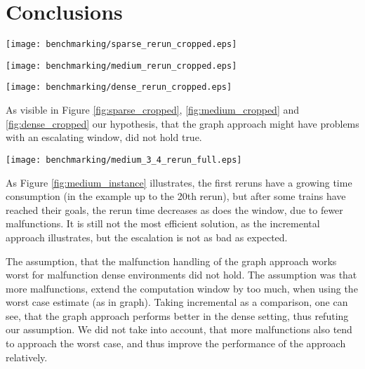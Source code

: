 \section{Conclusions}
\begin{figure*}
    \begin{minipage}[t]{0.32\textwidth}
        \texttt{[image: benchmarking/sparse\_rerun\_cropped.eps]}
        \caption{Sparse: Reruns}
        \label{fig:sparse_cropped}
    \end{minipage}
    \begin{minipage}[t]{0.32\textwidth}
        \texttt{[image: benchmarking/medium\_rerun\_cropped.eps]}
        \caption{Medium: Reruns}
        \label{fig:medium_cropped}
    \end{minipage}
    \begin{minipage}[t]{0.32\textwidth}
        \texttt{[image: benchmarking/dense\_rerun\_cropped.eps]}
        \caption{Dense: Reruns}
        \label{fig:dense_cropped}
    \end{minipage}
\end{figure*}

As visible in Figure \ref{fig:sparse_cropped}, \ref{fig:medium_cropped} and \ref{fig:dense_cropped} our hypothesis, that the graph approach might have problems with an escalating window, did not hold true.

\begin{figure*}
	\texttt{[image: benchmarking/medium\_3\_4\_rerun\_full.eps]}
	\caption{A selected medium Instance, 3\% Malfunction}
	\label{fig:medium_instance}
\end{figure*}

As Figure \ref{fig:medium_instance} illustrates, the first reruns have a growing time consumption (in the example up to the 20th rerun), but after some trains have reached their goals, the rerun time decreases as does the window, due to fewer malfunctions. It is still not the most efficient solution, as the incremental approach illustrates, but the escalation is not as bad as expected.

The assumption, that the malfunction handling of the graph approach works worst for malfunction dense environments did not hold. The assumption was that more malfunctions, extend the computation window by too much, when using the worst case estimate (as in graph). Taking incremental as a comparison, one can see, that the graph approach performs better in the dense setting, thus refuting our assumption. We did not take into account, that more malfunctions also tend to approach the worst case, and thus improve the performance of the approach relatively.

